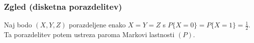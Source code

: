 \documentclass{beamer}
\begin{document}
\begin{frame}
    \frametitle{Zgled (disketna porazdelitev)}
    Naj bodo $(X,Y,Z)$ porazdeljene enako $X=Y=Z$ s $P\{X=0\} = P\{X=1\} = \frac{1}{2}. $
    Ta porazdelitev potem ustreza paroma Markovi lastnosti $(P)$.\\
    \begin{center}
        

\end{center}
\end{frame}
\end{document}
